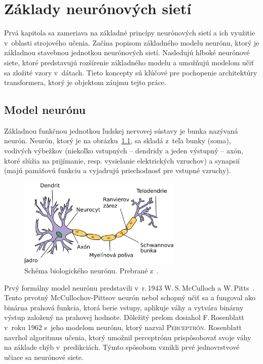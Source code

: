 \chapter{Základy neurónových sietí}\label{chap:neuron}

Prvá kapitola sa zameriava na základné princípy neurónových sietí a ich využitie v~oblasti strojového učenia. Začína popisom základného modelu neurónu, ktorý je základnou stavebnou jednotkou neurónových sietí. Nasledujú hlboké neurónové siete, ktoré predstavujú rozšírenie základného modelu a umožňujú modelom učiť sa zložité vzory v~dátach. Tieto koncepty sú kľúčové pre pochopenie architektúry transformera, ktorý je objektom záujmu tejto práce.

\section{Model neurónu}

Základnou funkčnou jednotkou ľudskej nervovej sústavy je bunka nazývaná neurón. Neurón, ktorý je na obrázku~\ref{fig:neuron}, sa skladá z~teľa bunky (soma), vodivých výbežkov (niekoľko vstupných -- dendridy a jeden výstupný -- axón, ktoré slúžia na prijímanie, resp. vysielanie elektrických vzruchov) a synapsií (majú pamäťovú funkciu a vyjadrujú priechodnosť pre vstupné vzruchy). 

\begin{figure}[!ht]
    \centering
    \includegraphics[width=0.7\textwidth]{obrazky/Neuron_slk.png}
    \caption{Schéma biologického neurónu. Prebrané z~\cite{wiki:neuron}.}
    \label{fig:neuron}
\end{figure}

Prvý formálny model neurónu predstavili v~r.\,1943 W.\,S.\,McCulloch a W.\,Pitts~\cite{McCulloch1990}. Tento prvotný McCullochov-Pittsov neurón nebol schopný učiť sa a fungoval ako binárna prahová funkcia, ktorá berie vstupy, aplikuje váhy a vytvára binárny výstup založený na prahovej hodnote. Dôležitý prelom dosiahol F.\,Rosenblatt v~roku 1962 s~jeho modelom neurónu, ktorý nazval \textsc{Perceptrón}. Rosenblatt navrhol algoritmus učenia, ktorý umožnil perceptrónu prispôsobovať svoje váhy na základe chýb v~predikciách. Týmto spôsobom vznikli prvé jednovrstvové učiace sa neurónové siete.

